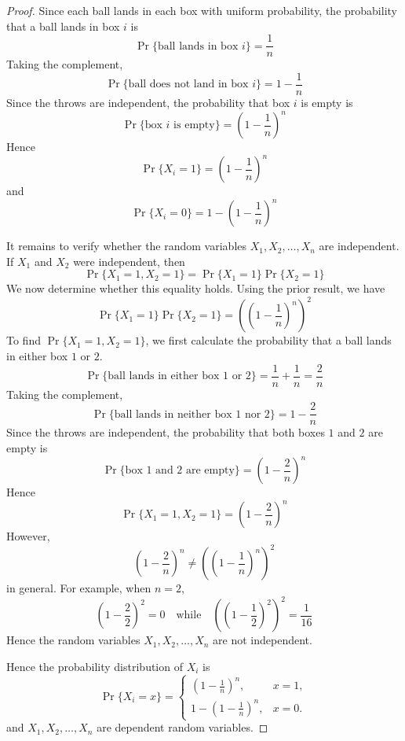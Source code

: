 \documentclass{article}
\begin{document}
\begin{proof}
    Since each ball lands in each box with uniform probability, the probability that a ball lands in box $i$ is
    \[
    \Pr\{\text{ball lands in box } i\} = \frac{1}{n}
    \]
    Taking the complement,
    \[
    \Pr\{\text{ball does not land in box } i\} = 1 - \frac{1}{n}
    \]
    Since the throws are independent, the probability that box $i$ is empty is 
    \[
    \Pr\{\text{box } i \text{ is empty}\} = \left(1 - \frac{1}{n}\right)^n
    \]
    Hence
    \[
    \Pr\{X_i = 1\} = \left(1 - \frac{1}{n}\right)^n
    \]
    and 
    \[
    \Pr\{X_i = 0\} = 1 - \left(1 - \frac{1}{n}\right)^n
    \]

    \medskip

    It remains to verify whether the random variables $X_1, X_2, \dots, X_n$ are independent. If $X_1$ and $X_2$ 
    were independent, then
    \[
    \Pr\{X_1 = 1, X_2 = 1\} = \Pr\{X_1 = 1\}\Pr\{X_2 = 1\}
    \]
    We now determine whether this equality holds. Using the prior result, we have
    \[
    \Pr\{X_1 = 1\}\Pr\{X_2 = 1\} = \left(\left(1 - \frac{1}{n}\right)^n\right)^2
    \]
    To find $\Pr\{X_1 = 1, X_2 = 1\}$, we first calculate the probability that a ball 
    lands in either box $1$ or $2$.
    \[
    \Pr\{\text{ball lands in either box } 1 \text{ or } 2\} = \frac{1}{n} + \frac{1}{n} = \frac{2}{n}
    \]
    Taking the complement,
    \[
    \Pr\{\text{ball lands in neither box } 1 \text{ nor } 2\} = 1 - \frac{2}{n}
    \]
    Since the throws are independent, the probability that both boxes $1$ and $2$ are 
    empty is
    \[
    \Pr\{\text{box } 1 \text{ and } 2 \text{ are empty}\} = \left(1 - \frac{2}{n}\right)^n
    \]
    Hence
    \[
    \Pr\{X_1 = 1, X_2 = 1\} = \left(1 - \frac{2}{n}\right)^n
    \]
    However,
    \[
    \left(1 - \frac{2}{n}\right)^n \neq \left(\left(1 - \frac{1}{n}\right)^n\right)^2
    \]
    in general. For example, when $n = 2$,
    \[
    \left(1 - \frac{2}{2}\right)^2 = 0 \quad \text{while} \quad 
    \left(\left(1 - \frac{1}{2}\right)^2\right)^2 = \frac{1}{16}
    \]
    Hence the random variables $X_1, X_2, \dots, X_n$ are not independent.

    \medskip

    Hence the probability distribution of $X_i$ is
    \[
    \Pr\{X_i = x\} =
    \begin{cases}
    \left(1 - \frac{1}{n}\right)^n, & x = 1, \\[6pt]
    1 - \left(1 - \frac{1}{n}\right)^n, & x = 0.
    \end{cases}
    \]
    and $X_1, X_2, \dots, X_n$ are dependent random variables.
\end{proof}
\end{document}
